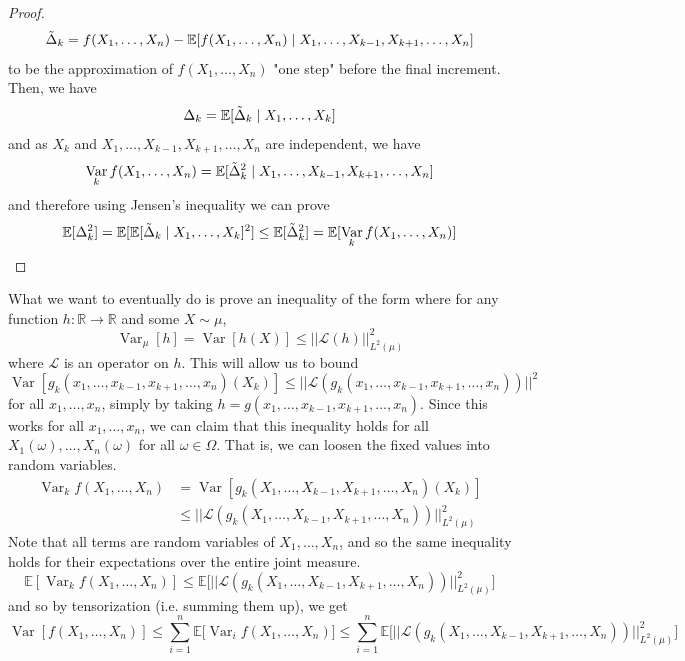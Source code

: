 \documentclass{article}
\DeclareMathOperator{\Var}{Var}
\theoremstyle{definition}
\theoremstyle{remark}
\theoremstyle{definition}
\begin{document}
\begin{proof}
  \[\Tilde{\Delta}_k = f(X_1, \ldots, X_n) - \mathbb{E}[f(X_1, \ldots, X_n) \mid X_1, \ldots, X_{k-1}, X_{k+1}, \ldots, X_n]\]
  to be the approximation of $f(X_1, \ldots, X_n)$ "one step" before the final increment. Then, we have 
  \[\Delta_k = \mathbb{E}[\Tilde{\Delta}_k \mid X_1, \ldots, X_k]\]
  and as $X_k$ and $X_1, \ldots, X_{k-1}, X_{k+1}, \ldots, X_n$ are independent, we have 
  \[\Var_k f(X_1, \ldots, X_n) = \mathbb{E}[\Tilde{\Delta}_k^2 \mid X_1, \ldots, X_{k-1}, X_{k+1}, \ldots, X_n] \]
  and therefore using Jensen's inequality we can prove 
  \[\mathbb{E}[\Delta_k^2] = \mathbb{E}[\mathbb{E}[ \Tilde{\Delta}_k \mid X_1, \ldots, X_k]^2 ] \leq \mathbb{E}[\Tilde{\Delta}_k^2] = \mathbb{E}[\Var_k f(X_1, \ldots, X_n)]\]
  \end{proof}

  What we want to eventually do is prove an inequality of the form where for any function $h: \mathbb{R} \rightarrow \mathbb{R}$ and some $X \sim \mu$, 
  \[\Var_\mu[h] = \Var [h(X)] \leq ||\mathcal{L}(h)||^2_{L^2 (\mu)}\]
  where $\mathcal{L}$ is an operator on $h$. This will allow us to bound 
  \[\Var [g_k (x_1, \ldots, x_{k-1}, x_{k+1}, \ldots, x_n)(X_k)] \leq ||\mathcal{L}(g_k (x_1, \ldots, x_{k-1}, x_{k+1}, \ldots, x_n))||^2\]
  for all $x_1, \ldots, x_n$, simply by taking $h = g(x_1, \ldots, x_{k-1}, x_{k+1}, \ldots, x_n)$. Since this works for all $x_1, \ldots, x_n$, we can claim that this inequality holds for all $X_1 (\omega), \ldots, X_n (\omega)$ for all $\omega \in \Omega$. That is, we can loosen the fixed values into random variables. 
  \begin{align*}
      \Var_{k} f(X_1, \ldots, X_n) & = \Var[g_k (X_1, \ldots, X_{k-1}, X_{k+1}, \ldots, X_n)(X_k)] \\
      & \leq || \mathcal{L}(g_k (X_1, \ldots, X_{k-1}, X_{k+1}, \ldots, X_n))||^2_{L^2 (\mu)} 
  \end{align*}
  Note that all terms are random variables of $X_1, \ldots, X_n$, and so the same inequality holds for their expectations over the entire joint measure. 
  \[\mathbb{E}[ \Var_{k} f(X_1, \ldots, X_n) ] \leq \mathbb{E} \big[ || \mathcal{L}(g_k (X_1, \ldots, X_{k-1}, X_{k+1}, \ldots, X_n))||^2_{L^2 (\mu)} \big] \]
  and so by tensorization (i.e. summing them up), we get 
  \[\Var[f(X_1, \ldots, X_n)] \leq \sum_{i=1}^n \mathbb{E} \big[ \Var_i f(X_1, \ldots, X_n) \big] \leq \sum_{i=1}^n \mathbb{E} \big[ || \mathcal{L}(g_k (X_1, \ldots, X_{k-1}, X_{k+1}, \ldots, X_n))||^2_{L^2 (\mu)} \big] \]
\end{document}
